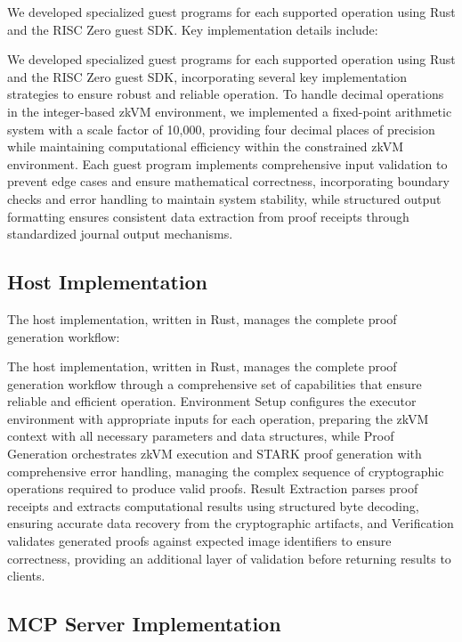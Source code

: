 \documentclass[11pt]{article}
\begin{document}
We developed specialized guest programs for each supported operation using Rust and the RISC Zero guest SDK. Key implementation details include:

We developed specialized guest programs for each supported operation using Rust and the RISC Zero guest SDK, incorporating several key implementation strategies to ensure robust and reliable operation. To handle decimal operations in the integer-based zkVM environment, we implemented a fixed-point arithmetic system with a scale factor of 10,000, providing four decimal places of precision while maintaining computational efficiency within the constrained zkVM environment. Each guest program implements comprehensive input validation to prevent edge cases and ensure mathematical correctness, incorporating boundary checks and error handling to maintain system stability, while structured output formatting ensures consistent data extraction from proof receipts through standardized journal output mechanisms.

\subsection{Host Implementation}

The host implementation, written in Rust, manages the complete proof generation workflow:

The host implementation, written in Rust, manages the complete proof generation workflow through a comprehensive set of capabilities that ensure reliable and efficient operation. Environment Setup configures the executor environment with appropriate inputs for each operation, preparing the zkVM context with all necessary parameters and data structures, while Proof Generation orchestrates zkVM execution and STARK proof generation with comprehensive error handling, managing the complex sequence of cryptographic operations required to produce valid proofs. Result Extraction parses proof receipts and extracts computational results using structured byte decoding, ensuring accurate data recovery from the cryptographic artifacts, and Verification validates generated proofs against expected image identifiers to ensure correctness, providing an additional layer of validation before returning results to clients.

\subsection{MCP Server Implementation}
\end{document}
